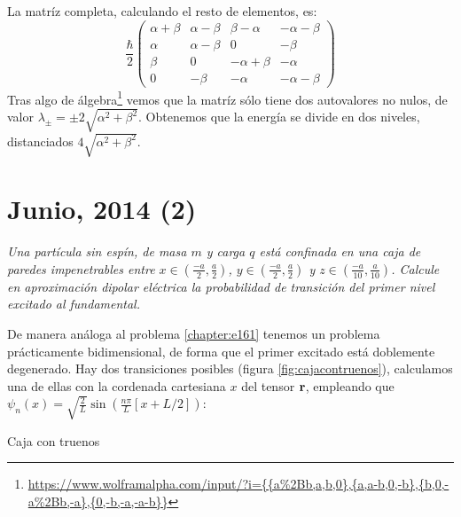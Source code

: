 La matríz completa, calculando el resto de elementos, es:
\begin{equation}
  \frac{\hbar}{2}
  \begin{pmatrix}
    \alpha+\beta & \alpha - \beta & \beta -\alpha & -\alpha -\beta \\
    \alpha & \alpha - \beta & 0 & -\beta \\
    \beta & 0 & -\alpha + \beta & -\alpha \\
    0 & -\beta & -\alpha & -\alpha - \beta
  \end{pmatrix}
\end{equation}
Tras algo de
álgebra\footnote{\url{https://www.wolframalpha.com/input/?i={{a\%2Bb,a,b,0},{a,a-b,0,-b},{b,0,-a\%2Bb,-a},{0,-b,-a,-a-b}}}}
vemos que la matríz sólo tiene dos autovalores no nulos, de valor
$\lambda_\pm = \pm 2\sqrt{\alpha^2+\beta^2}$. Obtenemos que la energía se divide en
dos niveles, distanciados $4\sqrt{\alpha^2+\beta^2}$.


\chapter{Junio, 2014 (2)}
\begin{tcolorbox}[halign=left]
  \emph{Una partícula sin espín, de masa $m$ y carga $q$ está
    confinada en una caja de paredes impenetrables entre
$x\in(\frac{-a}{2},\frac{a}{2})$, $y\in(\frac{-a}{2},\frac{a}{2})$ y
$z\in(\frac{-a}{10},\frac{a}{10})$.
Calcule en aproximación dipolar eléctrica la probabilidad de
transición del primer nivel excitado al fundamental.}
\end{tcolorbox}

De manera análoga al problema \ref{chapter:e161} tenemos un problema
prácticamente bidimensional, de forma que el primer excitado está
doblemente degenerado. Hay dos transiciones posibles (figura
\ref{fig:cajacontruenos}), calculamos una de ellas con la cordenada
cartesiana $x$ del
tensor $\bm{\mathrm{r}}$, empleando que $\psi_n(x) = \sqrt{\frac{2}{L}}\sin
\left( \frac{n\pi}{L} [x+L/2] \right)$:

\begin{marginfigure}
  \caption{Caja con truenos}
  \label{fig:cajacontruenos}
\end{marginfigure}

